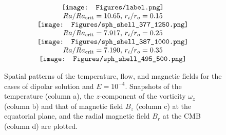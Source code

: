 \begin{figure*}
\begin{center}
\[
\begin{array}{c}
 \texttt{[image: Figures/label.png]} \\
  \mbox{$Ra / Ra_{\rm crit} = 10.65$, $r_{i} / r_{o} = 0.15$} \\
\texttt{[image: Figures/sph\_shell\_377\_1250.png]} \\
 \mbox{$Ra / Ra_{\rm crit} = 7.917$, $r_{i} / r_{o} = 0.25$} \\
 \texttt{[image: Figures/sph\_shell\_387\_1000.png]} \\
 \mbox{$Ra / Ra_{\rm crit} = 7.190$, $r_{i} / r_{o} = 0.35$} \\
 \texttt{[image: Figures/sph\_shell\_495\_500.png]}
\end{array}
\]
\end{center}
\caption{Spatial patterns of the temperature, flow,  and magnetic fields for the cases of dipolar solution and $E = 10^{-4}$. 
Snapshots of the temperature (column a), the $z$-component of the vorticity $\omega_{z}$ (column b) and that of magnetic field $B_{z}$ (column c) at the equatorial plane, and the radial magnetic field $B_{r}$ at the CMB (column d) are plotted.
}
\label{fig:Snap_Dipoler_E1-4}
\end{figure*}
